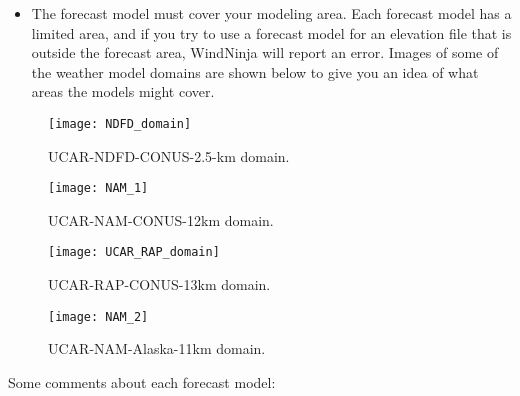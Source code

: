 \documentclass[12pt]{article}
\begin{document}
\begin{itemize}
\item The forecast model must cover your modeling area.  Each forecast model has a limited area, and if you try to use a forecast model for an elevation file that is outside the forecast area, WindNinja will report an error.  Images of some of the weather model domains are shown below to give you an idea of what areas the models might cover.
\end{itemize}

\begin{figure}[H]
	\centering
	\label{UCAR_NDFD_Domain}
	\texttt{[image: NDFD\_domain]}
	\caption*{UCAR-NDFD-CONUS-2.5-km domain.}
\end{figure}
\begin{figure}[H]
	\centering
	\label{UCAR_NDFD_Domain}
	\texttt{[image: NAM\_1]}
	\caption*{UCAR-NAM-CONUS-12km domain.}
\end{figure}
\begin{figure}[H]
	\centering
	\label{RAP_CONUS}
	\texttt{[image: UCAR\_RAP\_domain]}
	\caption*{UCAR-RAP-CONUS-13km domain.}
\end{figure}
\begin{figure}[H]
	\centering
	\label{RAP_CONUS}
	\texttt{[image: NAM\_2]}
	\caption*{UCAR-NAM-Alaska-11km domain.}
\end{figure}
Some comments about each forecast model:
\end{document}
